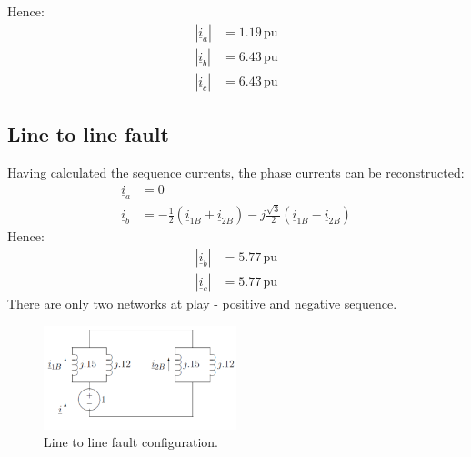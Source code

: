Hence:
\begin{align}
	\left| \underline{i}_{a}\right| & = 1.19\, \textrm{pu} \\
	\left| \underline{i}_{b}\right| & = 6.43\, \textrm{pu} \\
	\left| \underline{i}_{c}\right| & = 6.43\, \textrm{pu}
\end{align}
\subsection{Line to line fault}
Having calculated the sequence currents, the phase currents can be reconstructed:
\begin{align}
	\underline{i}_a & = 0                                                                                                                                       \\
	\underline{i}_b & = -\frac{1}{2}\left(\underline{i}_{1B}+ \underline{i}_{2B}\right) - j\frac{\sqrt{3}}{2}\left(\underline{i}_{1B}-\underline{i}_{2B}\right)
\end{align}
Hence:
\begin{align}
	\left|\underline{i}_{b}\right| & = 5.77\, \textrm{pu} \\
	\left|\underline{i}_{c}\right| & = 5.77\, \textrm{pu}
\end{align}
There are only two networks at play - positive and negative sequence.
\begin{figure}[H]
	\centering
	\includegraphics[width = 0.5\textwidth]{./img/figure44.png}
	\caption{Line to line fault configuration.}
\end{figure}

